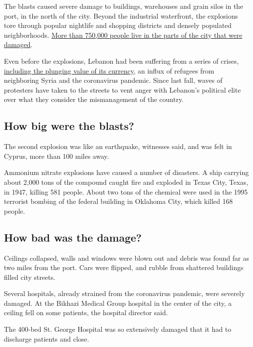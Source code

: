 The blasts caused severe damage to buildings, warehouses and grain silos
in the port, in the north of the city. Beyond the industrial waterfront,
the explosions tore through popular nightlife and shopping districts and
densely populated neighborhoods.
\href{https://www.nytimes.com/interactive/2020/08/04/world/middleeast/beirut-explosion-damage.html}{More
than 750,000 people live in the parts of the city that were damaged}.

Even before the explosions, Lebanon had been suffering from a series of
crises,
\href{https://www.nytimes.com/2020/06/11/world/middleeast/lebanon-protests.html}{including
the plunging value of its currency}, an influx of refugees from
neighboring Syria and the coronavirus pandemic. Since last fall, waves
of protesters have taken to the streets to vent anger with Lebanon's
political elite over what they consider the mismanagement of the
country.

\hypertarget{how-big-were-the-blasts}{%
\subsection{How big were the blasts?}\label{how-big-were-the-blasts}}

The second explosion was like an earthquake, witnesses said, and was
felt in Cyprus, more than 100 miles away.

Ammonium nitrate explosions have caused a number of disasters. A ship
carrying about 2,000 tons of the compound caught fire and exploded in
Texas City, Texas, in 1947, killing 581 people. About two tons of the
chemical were used in the 1995 terrorist bombing of the federal building
in Oklahoma City, which killed 168 people.

\hypertarget{how-bad-was-the-damage}{%
\subsection{How bad was the damage?}\label{how-bad-was-the-damage}}

Ceilings collapsed, walls and windows were blown out and debris was
found far as two miles from the port. Cars were flipped, and rubble from
shattered buildings filled city streets.

Several hospitals, already strained from the coronavirus pandemic, were
severely damaged. At the Bikhazi Medical Group hospital in the center of
the city, a ceiling fell on some patients, the hospital director said.

The 400-bed St. George Hospital was so extensively damaged that it had
to discharge patients and close.

